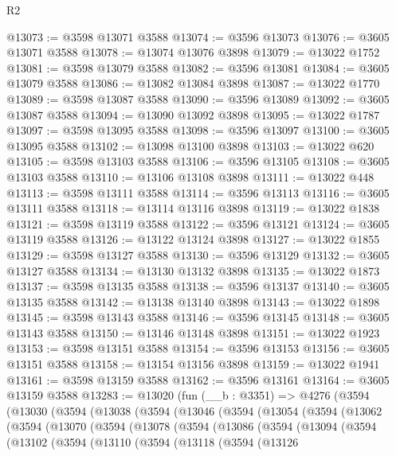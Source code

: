 \begin{lexlean}{R2}
\begin{coremodule}
@13073 := @3598 @13071 @3588
@13074 := @3596 @13073
@13076 := @3605 @13071 @3588
@13078 := @13074 @13076 @3898
@13079 := @13022 @1752
@13081 := @3598 @13079 @3588
@13082 := @3596 @13081
@13084 := @3605 @13079 @3588
@13086 := @13082 @13084 @3898
@13087 := @13022 @1770
@13089 := @3598 @13087 @3588
@13090 := @3596 @13089
@13092 := @3605 @13087 @3588
@13094 := @13090 @13092 @3898
@13095 := @13022 @1787
@13097 := @3598 @13095 @3588
@13098 := @3596 @13097
@13100 := @3605 @13095 @3588
@13102 := @13098 @13100 @3898
@13103 := @13022 @620
@13105 := @3598 @13103 @3588
@13106 := @3596 @13105
@13108 := @3605 @13103 @3588
@13110 := @13106 @13108 @3898
@13111 := @13022 @448
@13113 := @3598 @13111 @3588
@13114 := @3596 @13113
@13116 := @3605 @13111 @3588
@13118 := @13114 @13116 @3898
@13119 := @13022 @1838
@13121 := @3598 @13119 @3588
@13122 := @3596 @13121
@13124 := @3605 @13119 @3588
@13126 := @13122 @13124 @3898
@13127 := @13022 @1855
@13129 := @3598 @13127 @3588
@13130 := @3596 @13129
@13132 := @3605 @13127 @3588
@13134 := @13130 @13132 @3898
@13135 := @13022 @1873
@13137 := @3598 @13135 @3588
@13138 := @3596 @13137
@13140 := @3605 @13135 @3588
@13142 := @13138 @13140 @3898
@13143 := @13022 @1898
@13145 := @3598 @13143 @3588
@13146 := @3596 @13145
@13148 := @3605 @13143 @3588
@13150 := @13146 @13148 @3898
@13151 := @13022 @1923
@13153 := @3598 @13151 @3588
@13154 := @3596 @13153
@13156 := @3605 @13151 @3588
@13158 := @13154 @13156 @3898
@13159 := @13022 @1941
@13161 := @3598 @13159 @3588
@13162 := @3596 @13161
@13164 := @3605 @13159 @3588
@13283 := @13020
    (fun (__b : @3351) =>
    @4276
      (@3594
        (@13030
          (@3594
            (@13038
              (@3594
                (@13046
                  (@3594
                    (@13054
                      (@3594
                        (@13062
                          (@3594
                            (@13070
                              (@3594
                                (@13078
                                  (@3594
                                    (@13086
                                      (@3594
                                        (@13094
                                          (@3594
                                            (@13102
                                              (@3594
                                                (@13110
                                                  (@3594
                                                    (@13118
                                                      (@3594
                                                        (@13126

\end{coremodule}
\end{lexlean}
